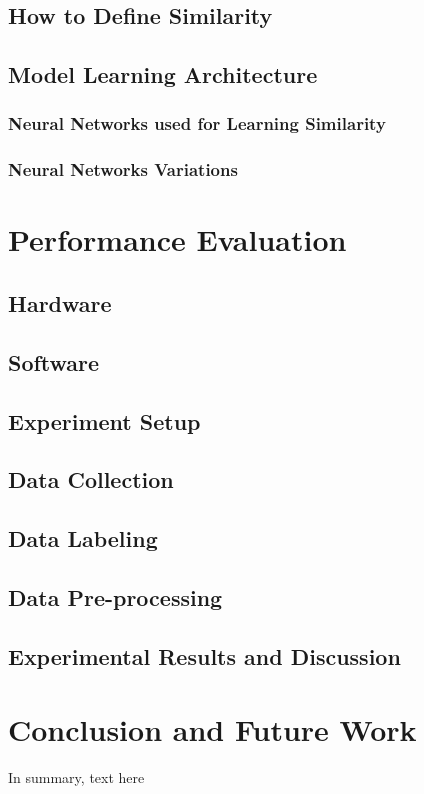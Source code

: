 \documentclass[12pt]{report}
\begin{document}
\section{How to Define Similarity}
\section{Model Learning Architecture}
\subsection{Neural Networks used for Learning Similarity}
\subsection{Neural Networks Variations}

\chapter{Performance Evaluation} \label{chapter 5}
\section{Hardware} 
\section{Software}
\section{Experiment Setup}
\section{Data Collection}
\section{Data Labeling}
\section{Data Pre-processing}
\section{Experimental Results and Discussion}

\chapter{Conclusion and Future Work} \label{chapter 6}
In summary, text here
\end{document}
